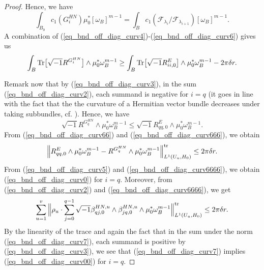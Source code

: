 \documentclass[12pt]{article}
\numberwithin{equation}{section}
\theoremstyle{theorem}
\theoremstyle{definition}
\theoremstyle{remark}
\newcommand{\imun} {\sqrt{-1}}
\newcommand{\tr}[1]{{\rm{Tr}} \big[ #1 \big]}
\begin{document}
\begin{proof}
		Hence, we have
		\begin{equation}\label{eq_bnd_off_diag_curv6}
			\int_{B_0} c_1(G_i^{HN}) \mu_0^* [\omega_B]^{m - 1}
			=
			\int_B c_1(\mathcal{F}_{\lambda_i} / \mathcal{F}_{\lambda_{i + 1}}) [\omega_B]^{m - 1}.
		\end{equation}
		A combination of (\ref{eq_bnd_off_diag_curv4})-(\ref{eq_bnd_off_diag_curv6}) gives us 
		\begin{equation}\label{eq_bnd_off_diag_curv66}
			\int_B \tr{\imun R^{G_i^{HN}}} \wedge \mu_0^* \omega_B^{m - 1}
			\geq 
			\int_B \tr{\imun R^E_{ii, 0}} \wedge \mu_0^* \omega_B^{m - 1} - 2 \pi \delta r.
		\end{equation}
		\par Remark now that by (\ref{eq_bnd_off_diag_curv3}), in the sum (\ref{eq_bnd_off_diag_curv2}), each summand is negative for $i = q$ (it goes in line with the fact that the the curvature of a Hermitian vector bundle decreases under taking subbundles, cf. \cite[Theorem V.14.5]{DemCompl}).
		Hence, we have
		\begin{equation}\label{eq_bnd_off_diag_curv666}
			\imun R^{G_q^{HN}} \wedge \mu_0^* \omega_B^{m - 1}
			\leq
			\imun R^E_{qq, 0} \wedge \mu_0^* \omega_B^{m - 1}.
		\end{equation}
		From (\ref{eq_bnd_off_diag_curv66}) and (\ref{eq_bnd_off_diag_curv666}), we obtain 
		\begin{equation}\label{eq_bnd_off_diag_curv6666}
			\Big\|
				R^E_{qq, 0} \wedge \mu_0^* \omega_B^{m - 1}
				-
				R^{G_q^{HN}} \wedge \mu_0^* \omega_B^{m - 1}
			\Big\|_{L^1(U_u, H_0)}^{{\rm{tr}}}
			\leq
			2 \pi \delta r.
		\end{equation}
		From (\ref{eq_bnd_off_diag_curv5}) and (\ref{eq_bnd_off_diag_curv6666}), we obtain (\ref{eq_bnd_off_diag_curv0}) for $i = q$.
		Moreover, from (\ref{eq_bnd_off_diag_curv2}) and (\ref{eq_bnd_off_diag_curv6666}), we get
		\begin{equation}\label{eq_bnd_off_diag_curv7}
			\sum_{u = 1}^{v}
			\Big\| \rho_u \cdot \sum_{j = 0}^{q - 1} \imun \beta_{q j, 0}^{HN, u} \wedge \beta_{j q, 0}^{HN, u}  \wedge \mu_0^* \omega_B^{m - 1} \Big\|_{L^1(U_u, H_0)}^{{\rm{tr}}}
			\leq
			2 \pi \delta r.
		\end{equation}
		By the linearity of the trace and again the fact that in the sum under the norm (\ref{eq_bnd_off_diag_curv7}), each summand is positive by (\ref{eq_bnd_off_diag_curv3}), we see that (\ref{eq_bnd_off_diag_curv7}) implies (\ref{eq_bnd_off_diag_curv00}) for $i = q$.
		\par 

\end{proof}
\end{document}
